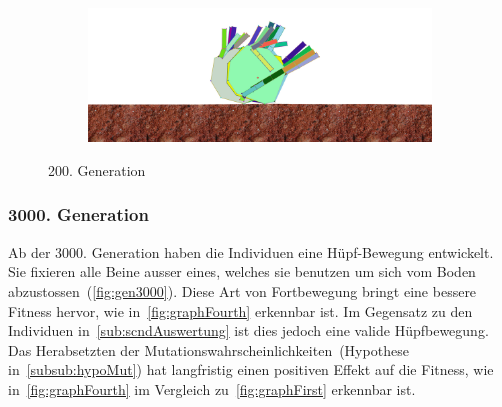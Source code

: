 \begin{figure}[H]
\begin{subfigure}[b]{0.45\textwidth}
            \includegraphics[width=\linewidth,center]{graphics/simulation-results/4_gen200_4}
            \caption{\label{fig:gen200_4}}
          \end{subfigure}
          \caption{200. Generation\label{fig:gen200}}
        \end{figure}

      \subsubsection{3000. Generation}

        Ab der 3000. Generation haben die Individuen eine Hüpf-Bewegung entwickelt.
        Sie fixieren alle Beine ausser eines, welches sie benutzen um sich vom Boden abzustossen~(\vref{fig:gen3000}).
        Diese Art von Fortbewegung bringt eine bessere Fitness hervor, wie in~\vref{fig:graphFourth} erkennbar ist.
        Im Gegensatz zu den Individuen in~\vref{sub:scndAuswertung} ist dies jedoch eine valide Hüpfbewegung.
        \\ %
        Das Herabsetzten der Mutationswahrscheinlichkeiten~(Hypothese in~\vref{subsub:hypoMut}) hat langfristig einen positiven Effekt auf die Fitness,
        wie in~\vref{fig:graphFourth} im Vergleich zu~\vref{fig:graphFirst} erkennbar ist.

        \vspace{0.5cm}

